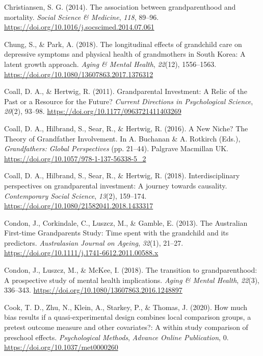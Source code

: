 \documentclass[
  english,
  man, noextraspace]{apa7}
\begin{document}
\leavevmode\hypertarget{ref-christiansenAssociationGrandparenthoodMortality2014}{}%
Christiansen, S. G. (2014). The association between grandparenthood and mortality. \emph{Social Science \& Medicine}, \emph{118}, 89--96. \url{https://doi.org/10.1016/j.socscimed.2014.07.061}

\leavevmode\hypertarget{ref-chungLongitudinalEffectsGrandchild2018}{}%
Chung, S., \& Park, A. (2018). The longitudinal effects of grandchild care on depressive symptoms and physical health of grandmothers in South Korea: A latent growth approach. \emph{Aging \& Mental Health}, \emph{22}(12), 1556--1563. \url{https://doi.org/10.1080/13607863.2017.1376312}

\leavevmode\hypertarget{ref-coallGrandparentalInvestmentRelic2011}{}%
Coall, D. A., \& Hertwig, R. (2011). Grandparental Investment: A Relic of the Past or a Resource for the Future? \emph{Current Directions in Psychological Science}, \emph{20}(2), 93--98. \url{https://doi.org/10.1177/0963721411403269}

\leavevmode\hypertarget{ref-coallNewNicheTheory2016}{}%
Coall, D. A., Hilbrand, S., Sear, R., \& Hertwig, R. (2016). A New Niche? The Theory of Grandfather Involvement. In A. Buchanan \& A. Rotkirch (Eds.), \emph{Grandfathers: Global Perspectives} (pp. 21--44). Palgrave Macmillan UK. \url{https://doi.org/10.1057/978-1-137-56338-5_2}

\leavevmode\hypertarget{ref-coallInterdisciplinaryPerspectivesGrandparental2018}{}%
Coall, D. A., Hilbrand, S., Sear, R., \& Hertwig, R. (2018). Interdisciplinary perspectives on grandparental investment: A journey towards causality. \emph{Contemporary Social Science}, \emph{13}(2), 159--174. \url{https://doi.org/10.1080/21582041.2018.1433317}

\leavevmode\hypertarget{ref-condonAustralianFirsttimeGrandparents2013}{}%
Condon, J., Corkindale, C., Luszcz, M., \& Gamble, E. (2013). The Australian First-time Grandparents Study: Time spent with the grandchild and its predictors. \emph{Australasian Journal on Ageing}, \emph{32}(1), 21--27. \url{https://doi.org/10.1111/j.1741-6612.2011.00588.x}

\leavevmode\hypertarget{ref-condonTransitionGrandparenthoodProspective2018}{}%
Condon, J., Luszcz, M., \& McKee, I. (2018). The transition to grandparenthood: A prospective study of mental health implications. \emph{Aging \& Mental Health}, \emph{22}(3), 336--343. \url{https://doi.org/10.1080/13607863.2016.1248897}

\leavevmode\hypertarget{ref-cookHowMuchBias2020}{}%
Cook, T. D., Zhu, N., Klein, A., Starkey, P., \& Thomas, J. (2020). How much bias results if a quasi-experimental design combines local comparison groups, a pretest outcome measure and other covariates?: A within study comparison of preschool effects. \emph{Psychological Methods}, \emph{Advance Online Publication}, 0. \url{https://doi.org/10.1037/met0000260}
\end{document}
